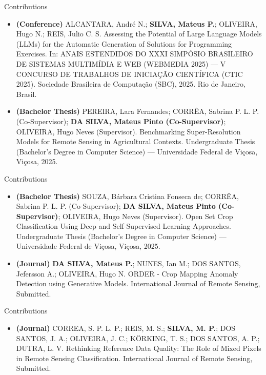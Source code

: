 \begin{frame}{Contributions}
\begin{itemize}
    \item \textbf{(Conference)} ALCANTARA, André N.; \textbf{SILVA, Mateus P.}; OLIVEIRA, Hugo N.; REIS, Julio C. S. Assessing the Potential of Large Language Models (LLMs) for the Automatic Generation of Solutions for Programming Exercises. In: ANAIS ESTENDIDOS DO XXXI SIMPÓSIO BRASILEIRO DE SISTEMAS MULTIMÍDIA E WEB (WEBMEDIA 2025) — V CONCURSO DE TRABALHOS DE INICIAÇÃO CIENTÍFICA (CTIC 2025). Sociedade Brasileira de Computação (SBC), 2025. Rio de Janeiro, Brasil.
    \item \textbf{(Bachelor Thesis)} PEREIRA, Lara Fernandes; CORRÊA, Sabrina P. L. P. (Co-Supervisor); \textbf{DA SILVA, Mateus Pinto (Co-Supervisor)}; OLIVEIRA, Hugo Neves (Supervisor). Benchmarking Super-Resolution Models for Remote Sensing in Agricultural Contexts. Undergraduate Thesis (Bachelor's Degree in Computer Science) — Universidade Federal de Viçosa, Viçosa, 2025.
\end{itemize}
\end{frame}

\begin{frame}{Contributions}
\begin{itemize}
    \item \textbf{(Bachelor Thesis)} SOUZA, Bárbara Cristina Fonseca de; CORRÊA, Sabrina P. L. P. (Co-Supervisor); \textbf{DA SILVA, Mateus Pinto (Co-Supervisor)}; OLIVEIRA, Hugo Neves (Supervisor). Open Set Crop Classification Using Deep and Self-Supervised Learning Approaches. Undergraduate Thesis (Bachelor's Degree in Computer Science) — Universidade Federal de Viçosa, Viçosa, 2025.
     \item \textbf{(Journal)} \textbf{DA SILVA, Mateus P.}; NUNES, Ian M.; DOS SANTOS, Jefersson A.; OLIVEIRA, Hugo N. ORDER - Crop Mapping Anomaly Detection using Generative Models. International Journal of Remote Sensing, Submitted.
\end{itemize}
\end{frame}

\begin{frame}{Contributions}
\begin{itemize}
    \item \textbf{(Journal)} CORREA, S. P. L. P.; REIS, M. S.; \textbf{SILVA, M. P.}; DOS SANTOS, J. A.; OLIVEIRA, J. C.; KÖRKING, T. S.; DOS SANTOS, A. P.; DUTRA, L. V. Rethinking Reference Data Quality: The Role of Mixed Pixels in Remote Sensing Classification. International Journal of Remote Sensing, Submitted.
\end{itemize}
\end{frame}



